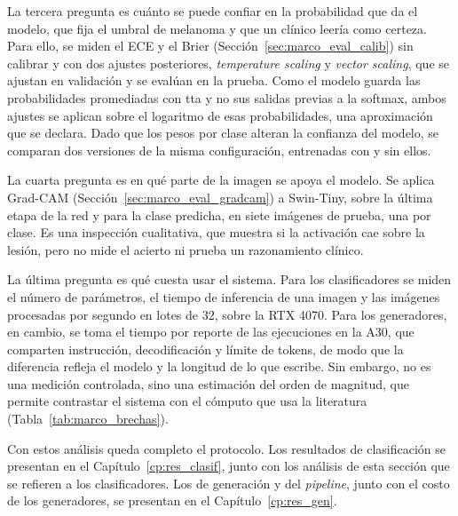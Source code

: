 La tercera pregunta es cuánto se puede confiar en la probabilidad que da el modelo, que fija el umbral de melanoma y
que un clínico leería como certeza. Para ello, se miden el ECE y el Brier (Sección~\ref{sec:marco_eval_calib}) sin
calibrar y con dos ajustes posteriores, \emph{temperature scaling} y \emph{vector scaling}, que se ajustan en validación
y se evalúan en la prueba. Como el modelo guarda las probabilidades
promediadas con \gls{tta} y no sus salidas previas a la softmax, ambos ajustes se aplican sobre el logaritmo de esas
probabilidades, una aproximación que se declara. Dado que los pesos por clase alteran la confianza del modelo,
se comparan dos versiones de la misma configuración, entrenadas con y sin ellos.

La cuarta pregunta es en qué parte de la imagen se apoya el modelo. Se aplica Grad-CAM
(Sección~\ref{sec:marco_eval_gradcam}) a Swin-Tiny, sobre la última etapa de la red y para la clase predicha, en siete
imágenes de prueba, una por clase. Es una inspección cualitativa, que muestra si la activación cae sobre la lesión, pero
no mide el acierto ni prueba un razonamiento clínico.

La última pregunta es qué cuesta usar el sistema. Para los clasificadores se miden el número de parámetros, el tiempo
de inferencia de una imagen y las imágenes procesadas por segundo en lotes de 32, sobre la RTX 4070. Para los
generadores, en cambio, se toma el tiempo por reporte de las ejecuciones en la A30, que comparten instrucción,
decodificación y límite de tokens, de modo que la diferencia refleja el modelo y la longitud de lo que escribe. Sin
embargo, no es una medición controlada, sino una estimación del orden de magnitud, que permite contrastar el sistema
con el cómputo que usa la literatura (Tabla~\ref{tab:marco_brechas}).

Con estos análisis queda completo el protocolo. Los resultados de clasificación se presentan en el
Capítulo~\ref{cp:res_clasif}, junto con los análisis de esta sección que se refieren a los clasificadores. Los de
generación y del \emph{pipeline}, junto con el costo de los generadores, se presentan en el Capítulo~\ref{cp:res_gen}.
